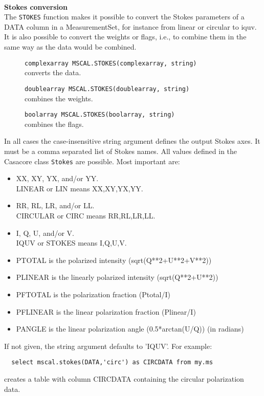 \paragraph*{}
{\bf Stokes conversion}
\\The \texttt{STOKES} function makes it possible to convert the Stokes
parameters of a DATA column in a MeasurementSet, for instance from
linear or circular to iquv. It is also possible to convert the weights
or flags, i.e., to combine them in the same way as the data would be combined.
\begin{description}
 \item[] \texttt{complexarray MSCAL.STOKES(complexarray, string)}\\
   converts the data.
 \item[] \texttt{doublearray MSCAL.STOKES(doublearray, string)}\\
   combines the weights.
 \item[] \texttt{boolarray MSCAL.STOKES(boolarray, string)}\\
   combines the flags.
\end{description}
In all cases the case-insensitive string argument defines the output Stokes
axes. It must be a comma separated list of Stokes names. All values
defined in the Casacore class \texttt{Stokes} are possible. Most
important are:
\begin{itemize}
 \item XX, XY, YX, and/or YY. \\LINEAR or LIN means XX,XY,YX,YY.
 \item RR, RL, LR, and/or LL. \\CIRCULAR or CIRC means RR,RL,LR,LL.
 \item I, Q, U, and/or V. \\IQUV or STOKES means I,Q,U,V.
 \item PTOTAL is the polarized intensity (sqrt(Q**2+U**2+V**2))
 \item PLINEAR is the linearly polarized intensity (sqrt(Q**2+U**2))
 \item PFTOTAL is the polarization fraction (Ptotal/I)
 \item PFLINEAR is the linear polarization fraction (Plinear/I)
 \item PANGLE is the linear polarization angle (0.5*arctan(U/Q)) (in radians)
\end{itemize}
If not given, the string argument defaults to 'IQUV'.
For example:
\begin{verbatim}
  select mscal.stokes(DATA,'circ') as CIRCDATA from my.ms
\end{verbatim}
creates a table with column CIRCDATA containing the circular
polarization data.

